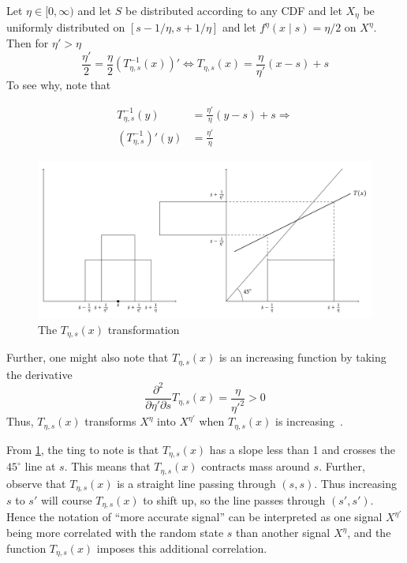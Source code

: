 \documentclass[11pt,a4paper,twoside]{article}
\begin{document}
\begin{example}\label{ex:t-transformation-1}
Let  \(\eta\in[0,\infty)\) and let \(S\) be distributed according to any CDF and let \(X_{\eta}\) be uniformly distributed on \([s-1/\eta,s+1/\eta]\) and let \(f^\eta(x\mid s)=\eta\big /2\) on \(X^\eta\). Then for \(\eta'>\eta\)
\[
	\frac{\eta'}{2}=\frac{\eta}{2}\left(T_{\eta,s}^{-1}(x)\right)'\Leftrightarrow T_{\eta,s}(x)=\frac{\eta}{\eta'}(x-s)+s
\]
To see why, note that

\begin{align*}
	T^{-1}_{\eta,s}(y)               &=\frac{\eta'}{\eta}(y-s)+s \Rightarrow \\
	\left(T^{-1}_{\eta,s}\right)'(y) &=\frac{\eta'}{\eta}
\end{align*}

\begin{figure}
	\includegraphics[width=\textwidth]{t-transformation.pdf}
	\caption{\label{fig:t-transformation}The \(T_{\eta,s}(x)\) transformation}
\end{figure}

Further, one might also note that \(T_{\eta,s}(x)\) is an increasing function by taking the derivative
\[
	\frac{\partial^2}{\partial \eta'\partial s}T_{\eta,s}(x)=\frac{\eta}{\eta'^2}>0
\]
Thus, \(T_{\eta,s}(x)\) transforms \(X^{\eta}\) into \(X^{\eta'}\) when \(T_{\eta,s}(x)\) is increasing~\citep{Persico1996}.

From \cref{fig:t-transformation}, the ting to note is that \(T_{\eta,s}(x)\) has a slope less than 1 and crosses the \(45^\circ\) line at \(s\). This means that \(T_{\eta,s}(x)\) contracts mass around \(s\). Further, observe that \(T_{\eta,s}(x)\) is a straight line passing through \((s,s)\). Thus increasing \(s\) to \(s'\) will course \(T_{\eta,s}(x)\) to shift up, so the line passes through \((s',s')\). Hence the notation of ``more accurate signal'' can be interpreted as one signal \(X^{\eta'}\) being more correlated with the random state \(s\) than another signal \(X^\eta\), and the function \(T_{\eta,s}(x)\) imposes this additional correlation.
\end{example}
\end{document}
